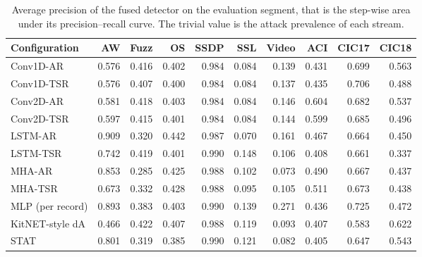 \begin{table}[ht]\centering\footnotesize\setlength{\tabcolsep}{3.5pt}
\begin{tabular}{lrrrrrrrrr}
\hline
\textbf{Configuration} & \textbf{AW} & \textbf{Fuzz} & \textbf{OS} & \textbf{SSDP} & \textbf{SSL} & \textbf{Video} & \textbf{ACI} & \textbf{CIC17} & \textbf{CIC18}\\
\hline
Conv1D-AR & 0.576 & 0.416 & 0.402 & 0.984 & 0.084 & 0.139 & 0.431 & 0.699 & 0.563\\
Conv1D-TSR & 0.576 & 0.407 & 0.400 & 0.984 & 0.084 & 0.137 & 0.435 & 0.706 & 0.488\\
Conv2D-AR & 0.581 & 0.418 & 0.403 & 0.984 & 0.084 & 0.146 & 0.604 & 0.682 & 0.537\\
Conv2D-TSR & 0.597 & 0.415 & 0.401 & 0.984 & 0.084 & 0.144 & 0.599 & 0.685 & 0.496\\
LSTM-AR & 0.909 & 0.320 & 0.442 & 0.987 & 0.070 & 0.161 & 0.467 & 0.664 & 0.450\\
LSTM-TSR & 0.742 & 0.419 & 0.401 & 0.990 & 0.148 & 0.106 & 0.408 & 0.661 & 0.337\\
MHA-AR & 0.853 & 0.285 & 0.425 & 0.988 & 0.102 & 0.073 & 0.490 & 0.667 & 0.437\\
MHA-TSR & 0.673 & 0.332 & 0.428 & 0.988 & 0.095 & 0.105 & 0.511 & 0.673 & 0.438\\
MLP (per record) & 0.893 & 0.383 & 0.403 & 0.990 & 0.139 & 0.271 & 0.436 & 0.725 & 0.472\\
KitNET-style dA & 0.466 & 0.422 & 0.407 & 0.988 & 0.119 & 0.093 & 0.407 & 0.583 & 0.622\\
STAT & 0.801 & 0.319 & 0.385 & 0.990 & 0.121 & 0.082 & 0.405 & 0.647 & 0.543\\
\hline
\end{tabular}
\caption{Average precision of the fused detector on the evaluation segment, that is the step-wise area under its precision--recall curve. The trivial value is the attack prevalence of each stream.}\label{tab:s_auprc}
\end{table}

